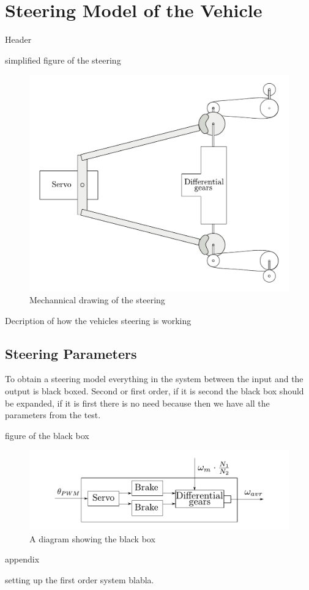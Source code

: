 \section{Steering Model of the Vehicle}\label{sec:SteeringModel}
Header

simplified figure of the steering
 \begin{figure}[H]
 	\centering
 	\includegraphics[scale=0.6]{figures/steeringMechanical.pdf}
 	\caption{Mechannical drawing of the steering}
 	\label{steeringMechanical}
 \end{figure}

Decription of how the vehicles steering is working

\subsection{Steering Parameters}
 To obtain a steering model everything in the system between the input and the output is black boxed. Second or first order, if it is second the black box should be expanded, if it is first there is no need because then we have all the parameters from the test.
 
 figure of the black box
 \begin{figure}[H]
 	\centering
 	\includegraphics[scale=1]{figures/steeringDiagramBlackBox.pdf}
 	\caption{A diagram showing the black box}
 	\label{steeringDiagramBlackBox}
 \end{figure}
 
 appendix
 
setting up the first order system blabla. 
